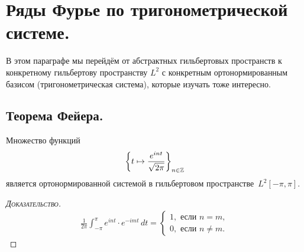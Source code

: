 \documentclass[../complex-analysis.tex]{subfiles}
\begin{document}
\newpage
\section{Ряды Фурье по тригонометрической системе.}

В этом параграфе мы перейдём от абстрактных гильбертовых пространств к конкретному гильбертову пространству $ L^{2} $ с конкретным ортонормированным базисом (тригонометрическая система), которые изучать тоже интересно.

\subsection{Теорема Фейера.}

\begin{claim}
 \label{claim:e^int is Orhonorm System}
 Множество функций
 \begin{align*}
  \left\{ t \mapsto \frac{e^{int}}{\sqrt{2\pi}} \right\}_{n \in \mathbb{Z}}
 \end{align*} является ортонормированной системой в гильбертовом пространстве~$ L^{2}[-\pi,\pi] $.
\end{claim}
\begin{proof}[\normalfont\textsc{Доказательство}]
 \begin{align*}
  \frac{1}{2\pi} \int_{-\pi}^{\pi} e^{int} \cdot e^{-imt}\,dt = \begin{cases}
   1, \text{ если } n = m, \\
   0, \text{ если } n \neq m.
  \end{cases} 
 \end{align*}
\end{proof}
\end{document}
